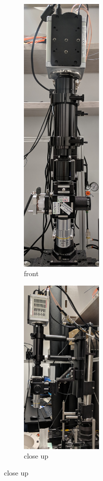 \begin{figure}[htb]
	\begin{subfigure}[t]{0.32\textwidth}\centering
		\includegraphics[width=4cm]{figures/setup4-front.jpg}
        \caption{front}
	\end{subfigure}
	\hfill
	\begin{subfigure}[t]{0.32\textwidth}\centering
		\includegraphics[width=4cm]{figures/setup4-side.jpg}
        \caption{close up}
	\end{subfigure}

\end{figure}
